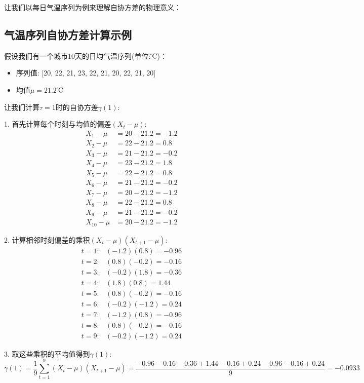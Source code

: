让我们以每日气温序列为例来理解自协方差的物理意义：

\subsection{气温序列自协方差计算示例}
假设我们有一个城市10天的日均气温序列(单位:℃)：
\begin{itemize}
    \item 序列值: [20, 22, 21, 23, 22, 21, 20, 22, 21, 20]
    \item 均值$\mu = 21.2$℃
\end{itemize}

让我们计算$\tau = 1$时的自协方差$\gamma(1)$:

1. 首先计算每个时刻与均值的偏差$(X_t - \mu)$:
\begin{align*}
    X_1 - \mu &= 20 - 21.2 = -1.2 \\
    X_2 - \mu &= 22 - 21.2 = 0.8 \\
    X_3 - \mu &= 21 - 21.2 = -0.2 \\
    X_4 - \mu &= 23 - 21.2 = 1.8 \\
    X_5 - \mu &= 22 - 21.2 = 0.8 \\
    X_6 - \mu &= 21 - 21.2 = -0.2 \\
    X_7 - \mu &= 20 - 21.2 = -1.2 \\
    X_8 - \mu &= 22 - 21.2 = 0.8 \\
    X_9 - \mu &= 21 - 21.2 = -0.2 \\
    X_{10} - \mu &= 20 - 21.2 = -1.2
\end{align*}

2. 计算相邻时刻偏差的乘积$(X_t - \mu)(X_{t+1} - \mu)$:
\begin{align*}
    t=1: &(-1.2)(0.8) = -0.96 \\
    t=2: &(0.8)(-0.2) = -0.16 \\
    t=3: &(-0.2)(1.8) = -0.36 \\
    t=4: &(1.8)(0.8) = 1.44 \\
    t=5: &(0.8)(-0.2) = -0.16 \\
    t=6: &(-0.2)(-1.2) = 0.24 \\
    t=7: &(-1.2)(0.8) = -0.96 \\
    t=8: &(0.8)(-0.2) = -0.16 \\
    t=9: &(-0.2)(-1.2) = 0.24
\end{align*}

3. 取这些乘积的平均值得到$\gamma(1)$:
$$\gamma(1) = \frac{1}{9}\sum_{t=1}^9(X_t - \mu)(X_{t+1} - \mu) = \frac{-0.96-0.16-0.36+1.44-0.16+0.24-0.96-0.16+0.24}{9} = -0.0933$$

